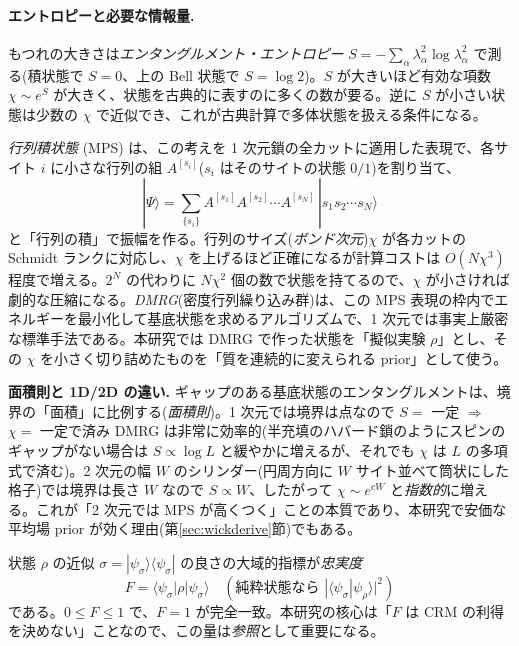 \documentclass[11pt,a4paper]{ltjsarticle}
\newcommand{\bra}[1]{\langle #1|}
\newcommand{\ket}[1]{|#1\rangle}
\newcommand{\braket}[2]{\langle #1|#2\rangle}
\newcommand{\ev}[1]{\langle #1\rangle}
\begin{document}
\paragraph{エントロピーと必要な情報量.}もつれの大きさは\emph{エンタングルメント・エントロピー} $S=-\sum_\alpha\lambda_\alpha^2\log\lambda_\alpha^2$ で測る(積状態で $S=0$、上の Bell 状態で $S=\log2$)。$S$ が大きいほど有効な項数 $\chi\sim e^{S}$ が大きく、状態を古典的に表すのに多くの数が要る。逆に $S$ が小さい状態は少数の $\chi$ で近似でき、これが古典計算で多体状態を扱える条件になる。

\emph{行列積状態} (MPS) は、この考えを 1 次元鎖の全カットに適用した表現で、各サイト $i$ に小さな行列の組 $A^{[s_i]}$($s_i$ はそのサイトの状態 $0/1$)を割り当て、
\begin{equation}
  \ket{\Psi} = \sum_{\{s_i\}} A^{[s_1]}A^{[s_2]}\cdots A^{[s_N]}\,\ket{s_1 s_2\cdots s_N}
\end{equation}
と「行列の積」で振幅を作る。行列のサイズ(\emph{ボンド次元})$\chi$ が各カットの Schmidt ランクに対応し、$\chi$ を上げるほど正確になるが計算コストは $O(N\chi^3)$ 程度で増える。$2^N$ の代わりに $N\chi^2$ 個の数で状態を持てるので、$\chi$ が小さければ劇的な圧縮になる。\emph{DMRG}(密度行列繰り込み群)は、この MPS 表現の枠内でエネルギーを最小化して基底状態を求めるアルゴリズムで、1 次元では事実上厳密な標準手法である。本研究では DMRG で作った状態を「擬似実験 $\rho$」とし、その $\chi$ を小さく切り詰めたものを「質を連続的に変えられる prior」として使う。

\begin{keybox}
\textbf{面積則と 1D/2D の違い.} ギャップのある基底状態のエンタングルメントは、境界の「面積」に比例する(\emph{面積則})。1 次元では境界は点なので $S=$ 一定 $\Rightarrow$ $\chi=$ 一定で済み DMRG は非常に効率的(半充填のハバード鎖のようにスピンのギャップがない場合は $S\propto\log L$ と緩やかに増えるが、それでも $\chi$ は $L$ の多項式で済む)。2 次元の幅 $W$ のシリンダー(円周方向に $W$ サイト並べて筒状にした格子)では境界は長さ $W$ なので $S\propto W$、したがって $\chi\sim e^{cW}$ と\emph{指数的}に増える。これが「2 次元では MPS が高くつく」ことの本質であり、本研究で安価な平均場 prior が効く理由(第\ref{sec:wickderive}節)でもある。
\end{keybox}

状態 $\rho$ の近似 $\sigma=\ket{\psi_\sigma}\bra{\psi_\sigma}$ の良さの大域的指標が\emph{忠実度}
\begin{equation}
  F = \ev{\psi_\sigma|\rho|\psi_\sigma}\quad(\text{純粋状態なら }|\braket{\psi_\sigma}{\psi_\rho}|^2)
\end{equation}
である。$0\le F\le1$ で、$F=1$ が完全一致。本研究の核心は「$F$ は CRM の利得を決めない」ことなので、この量は\emph{参照}として重要になる。
\end{document}
